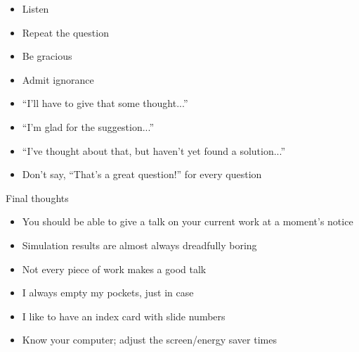 \documentclass[12pt]{article}
\newcommand{\headsize}{\fontsize{35}{35} \selectfont}
\newcommand{\smallsize}{\fontsize{25}{30} \selectfont}
\begin{document}
\hfill \begin{minipage}{9.5in}

\begin{itemize}
\itemsep18pt
\item Listen

\item Repeat the question 

\item Be gracious

\item Admit ignorance

\item ``I'll have to give that some thought...''

\item ``I'm glad for the suggestion...''

\item ``I've thought about that, but haven't yet found a solution...''

\item Don't say, ``That's a great question!'' for every question
\end{itemize}

\end{minipage}




\newpage

\headsize \color{myyellow}
\hfill \begin{minipage}{5.75in}
\centering
Final thoughts
\end{minipage}

\vspace{3cm} \color{mywhite} \smallsize

\hfill \begin{minipage}{9.5in}

\begin{itemize}
\itemsep18pt
\setlength{\rightskip}{0pt plus 1fil} %
\item You should be able to give a talk on your current work at a
  moment's notice

\item Simulation results are almost always dreadfully boring

\item Not every piece of work makes a good talk

\item I always empty my pockets, just in case

\item I like to have an index card with slide numbers

\item Know your computer; adjust the screen/energy saver times


\end{itemize}

\end{minipage}
\end{document}
